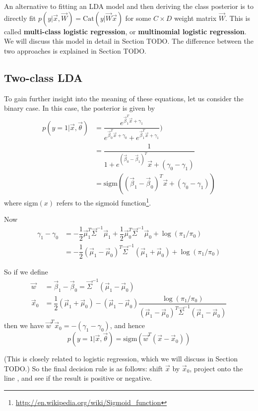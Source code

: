 An alternative to fitting an LDA model and then deriving the class posterior is to directly fit $p(y|\vec{x},\vec{W})=\text{Cat}(y|\vec{W}\vec{x})$ for some $C \times D$ weight matrix $\vec{W}$. This is called \textbf{multi-class logistic regression}, or \textbf{multinomial logistic regression}. We will discuss this model in detail in Section TODO. The difference between the two approaches is explained in Section TODO.


\subsection{Two-class LDA}
To gain further insight into the meaning of these equations, let us consider the binary case. In this case, the posterior is given by
\begin{align}
p(y=1|\vec{x},\vec{\theta})& =\dfrac{e^{\vec{\beta}_1^T\vec{x}+\gamma_1}}{e^{\vec{\beta}_0^T\vec{x}+\gamma_0}+e^{\vec{\beta}_1^T\vec{x}+\gamma_1}}) \\
  & =\dfrac{1}{1+e^(\vec{\beta}_0-\vec{\beta}_1)^T\vec{x}+(\gamma_0-\gamma_1)} \\
  & =\text{sigm}((\vec{\beta}_1-\vec{\beta}_0)^T\vec{x}+(\gamma_0-\gamma_1))
\end{align}
where sigm$(x)$ refers to the sigmoid function\footnote{\url{http://en.wikipedia.org/wiki/Sigmoid_function}}.

Now
\begin{align}
\gamma_1-\gamma_0& = -\dfrac{1}{2}\vec{\mu}_1^T\vec{\Sigma}^{-1}\vec{\mu}_1+\dfrac{1}{2}\vec{\mu}_0^T\vec{\Sigma}^{-1}\vec{\mu}_0 + \log(\pi_1/\pi_0) \\
 & =-\dfrac{1}{2}(\vec{\mu}_1-\vec{\mu}_0)^T\vec{\Sigma}^{-1}(\vec{\mu}_1+\vec{\mu}_0)+ \log(\pi_1/\pi_0)
\end{align}

So if we define
\begin{align}
\vec{w}& =\vec{\beta}_1-\vec{\beta}_0=\vec{\Sigma}^{-1}(\vec{\mu}_1-\vec{\mu}_0) \\
\vec{x}_0& =\dfrac{1}{2}(\vec{\mu}_1+\vec{\mu}_0)-(\vec{\mu}_1-\vec{\mu}_0)\dfrac{\log(\pi_1/\pi_0)}{(\vec{\mu}_1-\vec{\mu}_0)^T\vec{\Sigma}^{-1}(\vec{\mu}_1-\vec{\mu}_0)}
\end{align}
then we have $\vec{w}^T\vec{x}_0=-(\gamma_1-\gamma_0)$, and hence
\begin{equation}
p(y=1|\vec{x},\vec{\theta})=\text{sigm}(\vec{w}^T(\vec{x}-\vec{x}_0))
\end{equation}

(This is closely related to logistic regression, which we will discuss in Section TODO.) So the final decision rule is as follows: shift $\vec{x}$ by $\vec{x}_0$, project onto the line , and see if the result is positive or negative.

